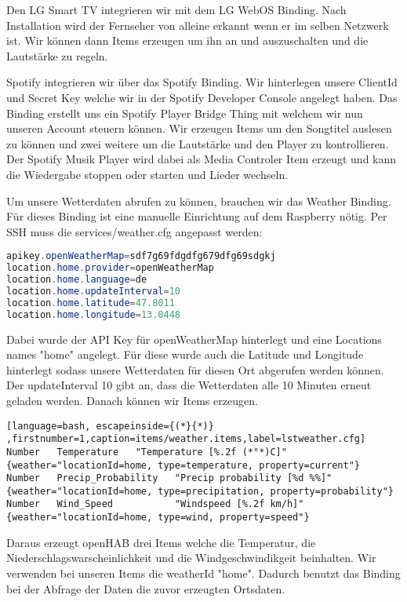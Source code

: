 		Den LG Smart TV integrieren wir mit dem LG WebOS Binding. Nach Installation wird der Fernseher von alleine erkannt wenn er im selben Netzwerk ist. Wir können dann Items erzeugen um ihn an und auszuschalten und die Lautstärke zu regeln.
		
		Spotify integrieren wir über das Spotify Binding. Wir hinterlegen unsere ClientId und Secret Key welche wir in der Spotify Developer Console angelegt haben. Das Binding erstellt uns ein Spotify Player Bridge Thing mit welchem wir nun unseren Account steuern können. Wir erzeugen Items um den Songtitel auslesen zu können und zwei weitere um die Lautstärke und den Player zu kontrollieren. Der Spotify Musik Player wird dabei als Media Controler Item erzeugt und kann die Wiedergabe stoppen oder starten und Lieder wechseln.
		
		Um unsere Wetterdaten abrufen zu können, brauchen wir das Weather Binding. Für dieses Binding ist eine manuelle Einrichtung auf dem Raspberry nötig. Per SSH muss die services/weather.cfg angepasst werden:
		
		\begin{lstlisting}[language=java,firstnumber=1,caption=services/weather.cfg,label=lstweather.cfg]
apikey.openWeatherMap=sdf7g69fdgdfg679dfg69sdgkj
location.home.provider=openWeatherMap
location.home.language=de
location.home.updateInterval=10
location.home.latitude=47.8011
location.home.longitude=13.0448
		\end{lstlisting}
		
		Dabei wurde der API Key für openWeatherMap hinterlegt und eine Locations names "home" angelegt. Für diese wurde auch die Latitude und Longitude hinterlegt sodass unsere Wetterdaten für diesen Ort abgerufen werden können. Der updateInterval 10 gibt an, dass die Wetterdaten alle 10 Minuten erneut geladen werden.
		Danach können wir Items erzeugen. 
		
				\begin{lstlisting}[language=bash, escapeinside={(*}{*)} ,firstnumber=1,caption=items/weather.items,label=lstweather.cfg]
Number   Temperature   "Temperature [%.2f (*°*)C]"   {weather="locationId=home, type=temperature, property=current"}
Number   Precip_Probability   "Precip probability [%d %%]"   {weather="locationId=home, type=precipitation, property=probability"}
Number   Wind_Speed           "Windspeed [%.2f km/h]"    {weather="locationId=home, type=wind, property=speed"}
		\end{lstlisting}
		
		Daraus erzeugt openHAB drei Items welche die Temperatur, die Niederschlagswarscheinlichkeit und die Windgeschwindikgeit beinhalten. 
		Wir verwenden bei unseren Items die weatherId "home". Dadurch benutzt das Binding bei der Abfrage der Daten die zuvor erzeugten Ortsdaten.
		
